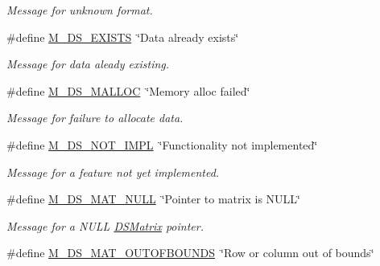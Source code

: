 \begin{DoxyCompactItemize}
\begin{DoxyCompactList}\small\item\em Message for unknown format. \item\end{DoxyCompactList}\item 
\hypertarget{group___m___d_s___messages_ga33ff33533363ff94af03b832587f47c6}{
\#define \hyperlink{group___m___d_s___messages_ga33ff33533363ff94af03b832587f47c6}{M\_\-DS\_\-EXISTS}~\char`\"{}Data already exists\char`\"{}}
\label{group___m___d_s___messages_ga33ff33533363ff94af03b832587f47c6}

\begin{DoxyCompactList}\small\item\em Message for data aleady existing. \item\end{DoxyCompactList}\item 
\hypertarget{group___m___d_s___messages_ga47106b8852d8baaf66a0e7f9bd67d36b}{
\#define \hyperlink{group___m___d_s___messages_ga47106b8852d8baaf66a0e7f9bd67d36b}{M\_\-DS\_\-MALLOC}~\char`\"{}Memory alloc failed\char`\"{}}
\label{group___m___d_s___messages_ga47106b8852d8baaf66a0e7f9bd67d36b}

\begin{DoxyCompactList}\small\item\em Message for failure to allocate data. \item\end{DoxyCompactList}\item 
\hypertarget{group___m___d_s___messages_ga79c48eacc7951aa68e4d094f0989faac}{
\#define \hyperlink{group___m___d_s___messages_ga79c48eacc7951aa68e4d094f0989faac}{M\_\-DS\_\-NOT\_\-IMPL}~\char`\"{}Functionality not implemented\char`\"{}}
\label{group___m___d_s___messages_ga79c48eacc7951aa68e4d094f0989faac}

\begin{DoxyCompactList}\small\item\em Message for a feature not yet implemented. \item\end{DoxyCompactList}\item 
\hypertarget{group___m___d_s___messages_gad80933e02bded8d239593be18ed3dea9}{
\#define \hyperlink{group___m___d_s___messages_gad80933e02bded8d239593be18ed3dea9}{M\_\-DS\_\-MAT\_\-NULL}~\char`\"{}Pointer to matrix is NULL\char`\"{}}
\label{group___m___d_s___messages_gad80933e02bded8d239593be18ed3dea9}

\begin{DoxyCompactList}\small\item\em Message for a NULL \hyperlink{struct_d_s_matrix}{DSMatrix} pointer. \item\end{DoxyCompactList}\item 
\hypertarget{group___m___d_s___messages_gaeb861d5820b984719e6f2ff0ed0d66d5}{
\#define \hyperlink{group___m___d_s___messages_gaeb861d5820b984719e6f2ff0ed0d66d5}{M\_\-DS\_\-MAT\_\-OUTOFBOUNDS}~\char`\"{}Row or column out of bounds\char`\"{}}
\label{group___m___d_s___messages_gaeb861d5820b984719e6f2ff0ed0d66d5}


\end{DoxyCompactItemize}
